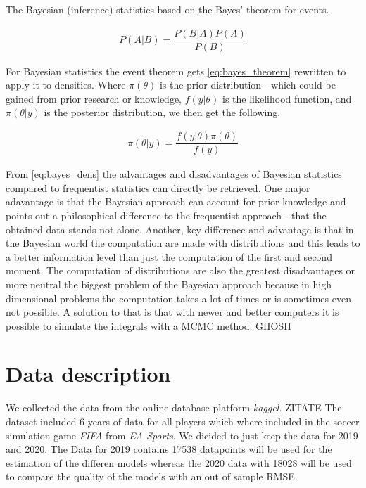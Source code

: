 \documentclass[12pt,a4paper]{article}
\begin{document}
The Bayesian (inference) statistics based on the Bayes' theorem for
events.

\begin{align}
\label{eq:bayes_theorem}
  P(A | B) = \dfrac{P (B | A) P(A)}{P(B)}
\end{align}

For Bayesian statistics the event theorem gets \eqref{eq:bayes_theorem}
rewritten to apply it to densities. Where \(\pi (\theta)\) is the prior
distribution - which could be gained from prior research or knowledge,
\(f(y | \theta )\) is the likelihood function, and \(\pi (\theta| y)\)
is the posterior distribution, we then get the following.

\begin{align}
\label{eq:bayes_dens}
  \pi (\theta | y) = \dfrac{f(y | \theta) \pi(\theta)}{f(y)}
\end{align}

From \eqref{eq:bayes_dens} the advantages and disadvantages of Bayesian
statistics compared to frequentist statistics can directly be retrieved.
One major adavantage is that the Bayesian approach can account for prior
knowledge and points out a philosophical difference to the frequentist
approach - that the obtained data stands not alone. Another, key
difference and advantage is that in the Bayesian world the computation
are made with distributions and this leads to a better information level
than just the computation of the first and second moment. The
computation of distributions are also the greatest disadvantages or more
neutral the biggest problem of the Bayesian approach because in high
dimensional problems the computation takes a lot of times or is
sometimes even not possible. A solution to that is that with newer and
better computers it is possible to simulate the integrals with a
\ac{MCMC} method. GHOSH

\newpage

\hypertarget{data-description}{%
\section{Data description}\label{data-description}}

We collected the data from the online database platform \emph{kaggel.}
\autocite{leone_fifa_2020} ZITATE The dataset included 6 years of data
for all players which where included in the soccer simulation game
\emph{FIFA} from \emph{EA Sports}. We dicided to just keep the data for
2019 and 2020. The Data for 2019 contains 17538 datapoints will be used
for the estimation of the differen models whereas the 2020 data with
18028 will be used to compare the quality of the models with an out of
sample \ac{RMSE}.
\end{document}
